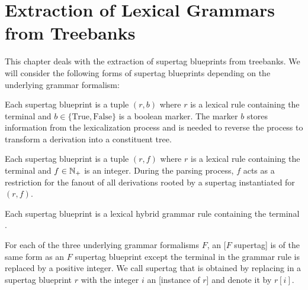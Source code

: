 \documentclass[../document.tex]{subfiles}
\begin{document}
    \chapter{Extraction of Lexical Grammars from Treebanks}\label{sec:extraction}
    This chapter deals with the extraction of supertag blueprints from treebanks.
    We will consider the following forms of supertag blueprints depending on the underlying grammar formalism:
    \begin{compactenum}
        \item
            Each  supertag blueprint is a tuple \((r, b)\) where \(r\) is a lexical  rule containing the terminal \wildcard{} and \(b \in \{\text{True}, \text{False}\}\) is a boolean marker.
            The marker \(b\) stores information from the lexicalization process and is needed to reverse the process to transform a derivation into a constituent tree.
        \item
            Each  supertag blueprint is a tuple \((r, f)\) where \(r\) is a lexical  rule containing the terminal \wildcard{} and \(f \in \mathbb{N}_+\) is an integer.
            During the parsing process, \(f\) acts as a restriction for the fanout of all derivations rooted by a supertag instantiated for \((r,f)\).
        \item Each  supertag blueprint is a lexical hybrid grammar rule containing the terminal \wildcard{}.
    \end{compactenum}
    For each of the three underlying grammar formalisms \(F\), an [\(F\) supertag] is of the same form as an \(F\) supertag blueprint except the terminal \wildcard{} in the grammar rule is replaced by a positive integer.
    We call supertag that is obtained by replacing \wildcard{} in a supertag blueprint \(r\) with the integer \(i\) an [instance of \(r\)] and denote it by \(r[i]\).
\end{document}
